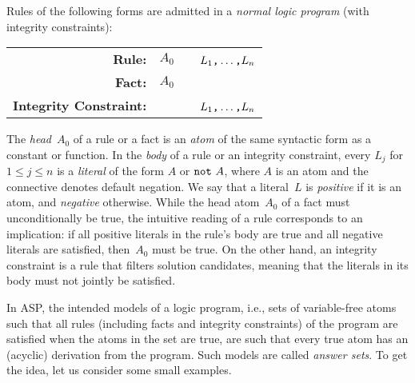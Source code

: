Rules of the following forms are admitted in a
\emph{normal logic program} (with integrity constraints):
\par
\medskip
\begin{tabular}{rl@{}l}\label{eq:normal:rule}
\textbf{Rule:} & $A_0$&~\code{:-}~$L_1\text{\texttt{,}}\dots\text{\texttt{,}}L_n$\code{.}
\\
\textbf{Fact:} & $A_0$&\code{.}
\\
\textbf{Integrity Constraint:} & &~\code{:-}~$L_1\texttt{,}\dots\texttt{,}L_n$\code{.}
\end{tabular}
%
%
%
\par
\medskip
\noindent
The \emph{head}~$A_0$ of a rule or a fact is an \emph{atom} of the same
syntactic form as a constant or function.
%
In the \emph{body} of a rule or an integrity constraint,
every $L_j$ for $1\leq j\leq n$ is a \emph{literal} of the form $A$ or $\texttt{not}~A$,
where $A$ is an atom and
the connective  denotes default negation.
%
%
We say that a literal~$L$ is \emph{positive} if it is an atom,
and \emph{negative} otherwise.
While the head atom~$A_0$ of a fact must unconditionally be true,
the intuitive reading of a rule corresponds to an implication:
if all positive literals in the rule's body are true and all negative
literals are satisfied, then~$A_0$ must be true.
On the other hand, an integrity constraint is a rule that filters solution candidates,
meaning that the literals in its body must not jointly be satisfied.

In ASP, the intended models of a logic program, i.e.,
sets of variable-free atoms such that all rules
(including facts and integrity constraints)
of the program are satisfied when the atoms in the set are true,
are such that every true atom has an (acyclic) derivation from the program.
Such models are called \emph{answer sets}.
To get the idea, let us consider some small examples.

